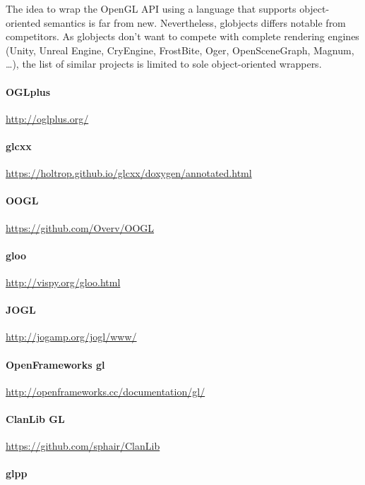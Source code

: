 \documentclass{article}
\begin{document}
The idea to wrap the OpenGL API using a language that supports object-oriented semantics is far from new. Nevertheless, globjects differs notable from competitors.
As globjects don't want to compete with complete rendering engines (Unity, Unreal Engine, CryEngine, FrostBite, Oger, OpenSceneGraph, Magnum, \dots), the list of similar projects is limited to sole object-oriented wrappers.

\paragraph{OGLplus}

\url{http://oglplus.org/}

\paragraph{glcxx}

\url{https://holtrop.github.io/glcxx/doxygen/annotated.html}

\paragraph{OOGL}

\url{https://github.com/Overv/OOGL}

\paragraph{gloo}

\url{http://vispy.org/gloo.html}

\paragraph{JOGL}

\url{http://jogamp.org/jogl/www/}

\paragraph{OpenFrameworks gl}

\url{http://openframeworks.cc/documentation/gl/}

\paragraph{ClanLib GL}

\url{https://github.com/sphair/ClanLib}

\paragraph{glpp}
\end{document}

